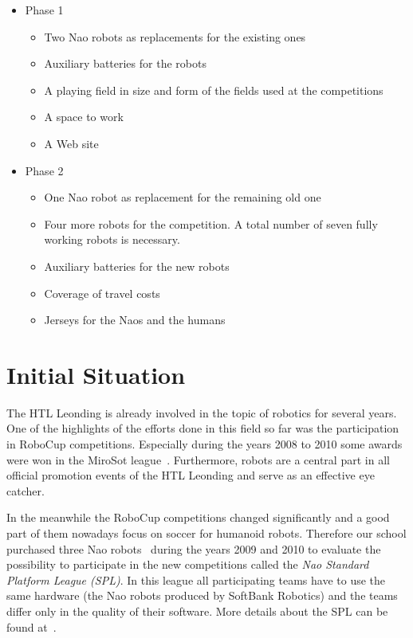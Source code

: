 \documentclass[12pt]{article}
\theoremstyle{definition}
\begin{document}
\begin{itemize}
	\item Phase 1
    	\begin{itemize}
            	\item Two Nao robots as replacements for the existing ones
		\item Auxiliary batteries for the robots
            	\item A playing field in size and form of the fields used at the competitions
		\item A space to work
            	\item A Web site
    	\end{itemize}
	\item Phase 2
	\begin{itemize}
		\item One Nao robot as replacement for the remaining old one
            	\item Four more robots for the competition. A total number of seven fully working robots is necessary.
            	\item Auxiliary batteries for the new robots
            	\item Coverage of travel costs
		\item Jerseys for the Naos and the humans
	\end{itemize}
\end{itemize}

\section{Initial Situation}
The HTL Leonding is already involved in the topic of robotics for several years. One of the highlights of the efforts done in this field so far was the participation in RoboCup competitions. Especially during the years 2008 to 2010 some awards were won in the MiroSot league~\cite{fira_micro_2014}. Furthermore, robots are a central part in all official promotion events of the HTL Leonding and serve as an effective eye catcher.

In the meanwhile the RoboCup competitions changed significantly and a good part of them nowadays focus on soccer for humanoid robots. Therefore our school purchased three Nao robots~\cite{softbank_robotics_who_2016} during the years 2009 and 2010 to evaluate the possibility to participate in the new competitions called the {\em Nao Standard Platform League (SPL)}. In this league all participating teams have to use the same hardware (the Nao robots produced by SoftBank Robotics) and the teams differ only in the quality of their software. More details about the SPL can be found at~\cite{spl_standard_2016}.
\end{document}
